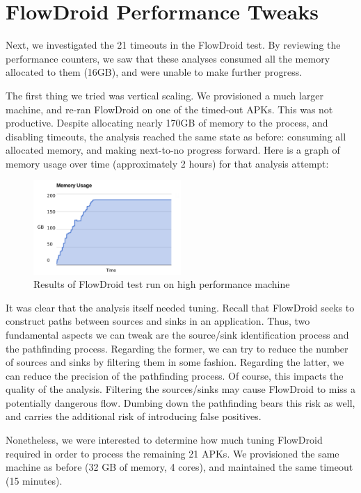\section{FlowDroid Performance Tweaks}
Next, we investigated the 21 timeouts in the FlowDroid test.  By reviewing the performance counters, we saw that these analyses consumed all the memory allocated to them (16GB), and were unable to make further progress.

The first thing we tried was vertical scaling.  We provisioned a much larger machine, and re-ran FlowDroid on one of the timed-out APKs.  This was not productive.  Despite allocating nearly 170GB of memory to the process, and disabling timeouts, the analysis reached the same state as before: consuming all allocated memory, and making next-to-no progress forward.  Here is a graph of memory usage over time (approximately 2 hours) for that analysis attempt:

\begin{figure}[h]
	\centering
	\includegraphics[width=0.50\textwidth]{flowdroid_perf.pdf}
	\caption{Results of FlowDroid test run on high performance machine}
	\label{fig:high_phase1}
\end{figure}

It was clear that the analysis itself needed tuning.  Recall that FlowDroid seeks to construct paths between sources and sinks in an application.  Thus, two fundamental aspects we can tweak are the source/sink identification process and the pathfinding process.  Regarding the former, we can try to reduce the number of sources and sinks by filtering them in some fashion.  Regarding the latter, we can reduce the precision of the pathfinding process.  Of course, this impacts the quality of the analysis.  Filtering the sources/sinks may cause FlowDroid to miss a potentially dangerous flow.  Dumbing down the pathfinding bears this risk as well, and carries the additional risk of introducing false positives. 

Nonetheless, we were interested to determine how much tuning FlowDroid required in order to process the remaining 21 APKs.  We provisioned the same machine as before (32 GB of memory, 4 cores), and maintained the same timeout (15 minutes).  

